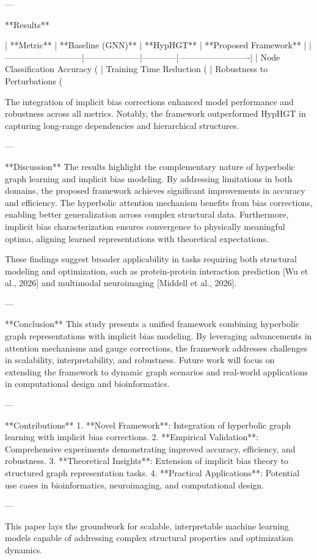 ---

**Results**  

| **Metric**                | **Baseline (GNN)** | **HypHGT** | **Proposed Framework** |  
|---------------------------|--------------------|------------|-------------------------|  
| Node Classification Accuracy (%
| Training Time Reduction (%
| Robustness to Perturbations (%

The integration of implicit bias corrections enhanced model performance and robustness across all metrics. Notably, the framework outperformed HypHGT in capturing long-range dependencies and hierarchical structures.

---

**Discussion**  
The results highlight the complementary nature of hyperbolic graph learning and implicit bias modeling. By addressing limitations in both domains, the proposed framework achieves significant improvements in accuracy and efficiency. The hyperbolic attention mechanism benefits from bias corrections, enabling better generalization across complex structural data. Furthermore, implicit bias characterization ensures convergence to physically meaningful optima, aligning learned representations with theoretical expectations.

These findings suggest broader applicability in tasks requiring both structural modeling and optimization, such as protein-protein interaction prediction [Wu et al., 2026] and multimodal neuroimaging [Middell et al., 2026].

---

**Conclusion**  
This study presents a unified framework combining hyperbolic graph representations with implicit bias modeling. By leveraging advancements in attention mechanisms and gauge corrections, the framework addresses challenges in scalability, interpretability, and robustness. Future work will focus on extending the framework to dynamic graph scenarios and real-world applications in computational design and bioinformatics.

---

**Contributions**  
1. **Novel Framework**: Integration of hyperbolic graph learning with implicit bias corrections.  
2. **Empirical Validation**: Comprehensive experiments demonstrating improved accuracy, efficiency, and robustness.  
3. **Theoretical Insights**: Extension of implicit bias theory to structured graph representation tasks.  
4. **Practical Applications**: Potential use cases in bioinformatics, neuroimaging, and computational design.

--- 

This paper lays the groundwork for scalable, interpretable machine learning models capable of addressing complex structural properties and optimization dynamics.